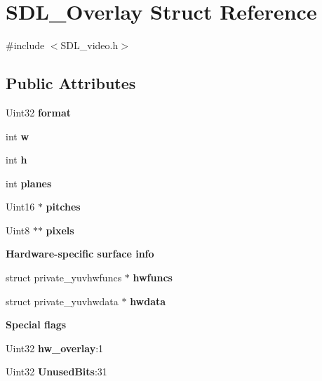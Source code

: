 \section{S\+D\+L\+\_\+\+Overlay Struct Reference}
\label{struct_s_d_l___overlay}


{\ttfamily \#include $<$S\+D\+L\+\_\+video.\+h$>$}

\subsection*{Public Attributes}
\begin{DoxyCompactItemize}
\item 
Uint32 {\bf format}
\item 
int {\bfseries w}\label{struct_s_d_l___overlay_a8a73fe76717c183d52dd67a6981fd84d}

\item 
int {\bf h}
\item 
int {\bf planes}
\item 
Uint16 $\ast$ {\bf pitches}
\item 
Uint8 $\ast$$\ast$ {\bf pixels}
\end{DoxyCompactItemize}
\begin{Indent}{\bf Hardware-\/specific surface info}\par
\begin{DoxyCompactItemize}
\item 
struct private\+\_\+yuvhwfuncs $\ast$ {\bfseries hwfuncs}\label{struct_s_d_l___overlay_aba6df163c475c57ba729bd9b86f87963}

\item 
struct private\+\_\+yuvhwdata $\ast$ {\bfseries hwdata}\label{struct_s_d_l___overlay_acc40482a067d5c106747dab61bcee3c4}

\end{DoxyCompactItemize}
\end{Indent}
\begin{Indent}{\bf Special flags}\par
\begin{DoxyCompactItemize}
\item 
Uint32 {\bf hw\+\_\+overlay}\+:1
\item 
Uint32 {\bfseries Unused\+Bits}\+:31\label{struct_s_d_l___overlay_a3dff6185e5d7cba5455b17cbf96d23ed}

\end{DoxyCompactItemize}
\end{Indent}


